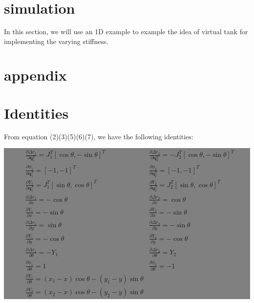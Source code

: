 \documentclass[]{article}
\begin{document}
\section{simulation}
In this section, we will use an 1D example to example the idea of virtual tank for implementing the varying stiffness.


\section{appendix}
\appendix
\section{Identities}
\label{sec::app1}
From equation (2)(3)(5)(6)(7), we have the following identities:

\colorbox{gray}{
\begin{minipage}{9cm}
 \begin{align*}
 &\frac{\partial \Delta r_1}{\partial \mathbf{q}_1^T}=J_{1}^T\left[\cos\theta,-\sin\theta\right]^T 
 &\frac{\partial \Delta r_2}{\partial \mathbf{q}_2^T}=-J_{2}^T\left[\cos\theta,-\sin\theta\right]^T\nonumber\\
 &\frac{\partial \phi_1}{\partial \mathbf{q}_1^T}=[-1,-1]^T
 &\frac{\partial \phi_2}{\partial \mathbf{q}_2^T}=[-1,-1]^T\nonumber\\
 &\frac{\partial Y_1}{\partial\mathbf{q}_1^T}=J_1^T[\sin\theta,\cos\theta]^T
 &\frac{\partial Y_2}{\partial \mathbf{q}_2^T}=J_2^T[\sin\theta,\cos\theta]^T\nonumber\\
 &\frac{\partial \Delta r_1}{\partial x}=-\cos\theta
 &\frac{\partial \Delta r_2}{\partial x}=\cos\theta \nonumber\\
 &\frac{\partial Y_1}{\partial x}=-\sin\theta 
 &\frac{\partial Y_2}{\partial x}=-\sin\theta \nonumber\\
 &\frac{\partial \Delta r_1}{\partial y}=\sin\theta&\frac{\partial \Delta r_2}{\partial y}=-\sin\theta \nonumber\\
  &\frac{\partial Y_1}{\partial y}=-\cos\theta &\frac{\partial Y_2}{\partial y}=-\cos\theta \nonumber\\
  &\frac{\partial \Delta r_1}{\partial \theta}=-Y_1&\frac{\partial \Delta r_2}{\partial \theta}=Y_2\nonumber\\
  &\frac{\partial \phi_1}{\partial \theta}=1&\frac{\partial \phi_2}{\partial \theta}=-1\nonumber\\
  &\frac{\partial Y_1}{\partial \theta}=(x_1-x)\cos\theta-(y_1-y)\sin\theta&\\
  &\frac{\partial Y_2}{\partial \theta}=(x_2-x)\cos\theta-(y_2-y)\sin\theta&\nonumber
 \end{align*}
\end{minipage}}
\end{document}
